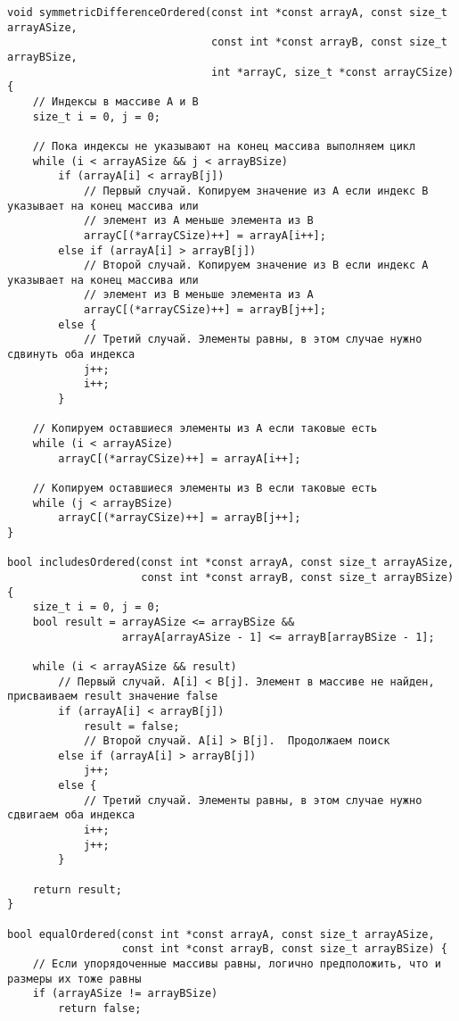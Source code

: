 \documentclass[a4paper,14pt]{extarticle}
\begin{document}
\begin{enumerate}[№1. ]
\begin{enumerate}[label=\asbuk*),ref=\asbuk*]
\begin{verbatim}
void symmetricDifferenceOrdered(const int *const arrayA, const size_t arrayASize,
                                const int *const arrayB, const size_t arrayBSize,
                                int *arrayC, size_t *const arrayCSize) {
    // Индексы в массиве A и B
    size_t i = 0, j = 0;

    // Пока индексы не указывают на конец массива выполняем цикл
    while (i < arrayASize && j < arrayBSize)
        if (arrayA[i] < arrayB[j])
            // Первый случай. Копируем значение из A если индекс B указывает на конец массива или
            // элемент из A меньше элемента из B
            arrayC[(*arrayCSize)++] = arrayA[i++];
        else if (arrayA[i] > arrayB[j])
            // Второй случай. Копируем значение из B если индекс A указывает на конец массива или
            // элемент из B меньше элемента из A
            arrayC[(*arrayCSize)++] = arrayB[j++];
        else {
            // Третий случай. Элементы равны, в этом случае нужно сдвинуть оба индекса
            j++;
            i++;
        }

    // Копируем оставшиеся элементы из A если таковые есть
    while (i < arrayASize)
        arrayC[(*arrayCSize)++] = arrayA[i++];

    // Копируем оставшиеся элементы из B если таковые есть
    while (j < arrayBSize)
        arrayC[(*arrayCSize)++] = arrayB[j++];
}

bool includesOrdered(const int *const arrayA, const size_t arrayASize,
                     const int *const arrayB, const size_t arrayBSize) {
    size_t i = 0, j = 0;
    bool result = arrayASize <= arrayBSize &&
                  arrayA[arrayASize - 1] <= arrayB[arrayBSize - 1];

    while (i < arrayASize && result)
        // Первый случай. A[i] < B[j]. Элемент в массиве не найден, присваиваем result значение false
        if (arrayA[i] < arrayB[j])
            result = false;
            // Второй случай. A[i] > B[j].  Продолжаем поиск
        else if (arrayA[i] > arrayB[j])
            j++;
        else {
            // Третий случай. Элементы равны, в этом случае нужно сдвигаем оба индекса
            i++;
            j++;
        }

    return result;
}

bool equalOrdered(const int *const arrayA, const size_t arrayASize,
                  const int *const arrayB, const size_t arrayBSize) {
    // Если упорядоченные массивы равны, логично предположить, что и размеры их тоже равны
    if (arrayASize != arrayBSize)
        return false;


\end{verbatim}
\end{enumerate}
\end{enumerate}
\end{document}
